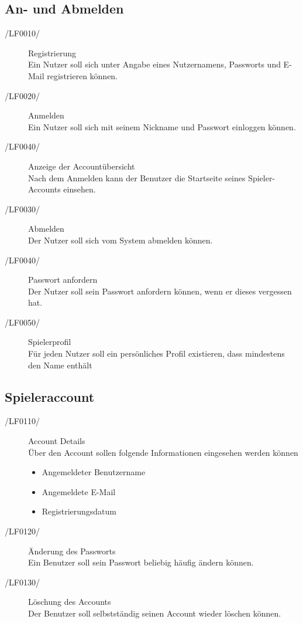 \documentclass[11pt,a4paper]{scrreprt}
\begin{document}
\subsection{An- und Abmelden}
\begin{description}
\item[/LF0010/] Registrierung \\
Ein Nutzer soll sich unter Angabe eines Nutzernamens, Passworts und E-Mail registrieren können.

\item[/LF0020/] Anmelden \\
Ein Nutzer soll sich mit seinem Nickname und Passwort einloggen können.

\item[/LF0040/] Anzeige der Accountübersicht \\
Nach dem Anmelden kann der Benutzer die Startseite seines Spieler-Accounts einsehen. %

\item[/LF0030/] Abmelden \\
Der Nutzer soll sich vom System abmelden können.

\item[/LF0040/] Passwort anfordern \\
Der Nutzer soll sein Passwort anfordern können, wenn er dieses vergessen hat.

\item[/LF0050/] Spielerprofil \\
Für jeden Nutzer soll ein persönliches Profil existieren, dass mindestens den Name enthält
\end{description}

\subsection{Spieleraccount}
\begin{description}
\item[/LF0110/] Account Details \\
Über den Account sollen folgende Informationen eingesehen werden können
	\begin{itemize}
	\item Angemeldeter Benutzername
	\item Angemeldete E-Mail
	\item Registrierungsdatum
	\end{itemize}
	
\item[/LF0120/] Änderung des Passworts \\
Ein Benutzer soll sein Passwort beliebig häufig ändern können.

\item[/LF0130/] Löschung des Accounts \\
Der Benutzer soll selbstständig seinen Account wieder löschen können.
\end{description}
\end{document}
